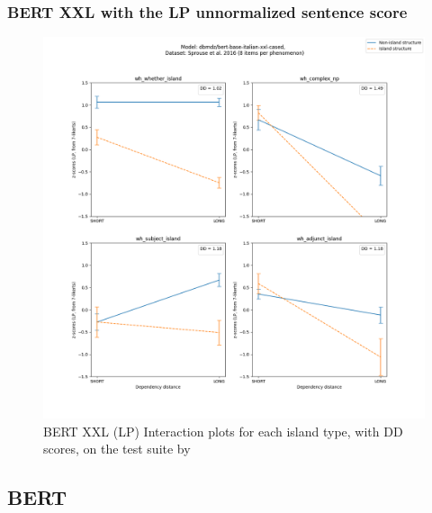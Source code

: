 \subsubsection{BERT XXL with the LP unnormalized sentence score}
\begin{figure}[h]
	\centering
	\includegraphics[width=1\textwidth]{images/Chapter1/Sprouse_wh_dbmdz_bert-base-italian-xxl-cased_LP-zscores-likert-2022-09-14_h17m27s24.png} 
	\caption{BERT XXL (LP) Interaction plots for each island type, with DD scores, on the test suite by \citet{sprouse2016experimental}}
	\label{fig:sprouse_bert_lp} 
	\medskip
\end{figure}	

\clearpage
\subsection{BERT}
